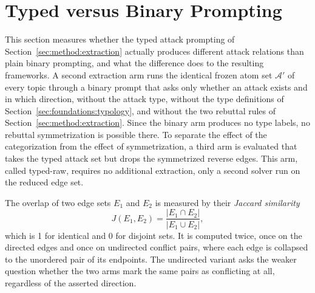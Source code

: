 \section{Typed versus Binary Prompting}
\label{sec:evaluation:ablation}

This section measures whether the typed attack prompting of
Section~\ref{sec:method:extraction} actually produces different attack
relations than plain binary prompting, and what the difference does to the
resulting frameworks. A second extraction arm runs the identical frozen atom
set $\mathcal{A}'$ of every topic through a binary prompt that asks only
whether an attack exists and in which direction, without the attack type,
without the type definitions of Section~\ref{sec:foundations:typology}, and
without the two rebuttal rules of Section~\ref{sec:method:extraction}. Since the binary arm produces no type
labels, no rebuttal symmetrization is possible there. To separate the effect of
the categorization from the effect of symmetrization, a third arm is evaluated
that takes the typed attack set but drops the symmetrized reverse edges. This
arm, called typed-raw, requires no additional extraction, only a second solver
run on the reduced edge set.

The overlap of two edge sets $E_1$ and $E_2$ is measured by their
\emph{Jaccard similarity}
\begin{equation*}
J(E_1, E_2) = \frac{|E_1 \cap E_2|}{|E_1 \cup E_2|},
\end{equation*}
which is 1 for identical and 0 for disjoint sets. It is computed twice, once
on the directed edges and once on undirected conflict pairs, where each edge
is collapsed to the unordered pair of its endpoints. The undirected variant
asks the weaker question whether the two arms mark the same pairs as
conflicting at all, regardless of the asserted direction.

\begin{table}[tb]
  \centering
  \caption{Typed versus binary prompting on identical atom sets. ``$|E|$''
  columns give the number of accepted directed edges for the typed arm, the
  typed arm without symmetrized edges (raw), and the binary arm.
  ``$J$'' columns give the Jaccard similarity of typed-raw and binary edge
  sets, directed and undirected. \#Pr counts preferred extensions per arm, and
  the numbers of stable extensions are identical to \#Pr in every cell.
  ``Same-st.'' counts accepted attacks between arguments of the same stance,
  for the typed arm on the final edge set including symmetrized edges.}
  \label{tab:evaluation:ablation}
  \small
  \setlength{\tabcolsep}{4pt}
  
\end{table}

